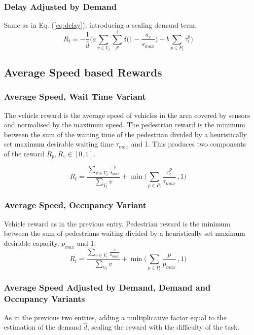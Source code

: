 \documentclass[a4paper, conference]{IEEEtran}
\begin{document}
\subsubsection{Delay Adjusted by Demand}
Same as in Eq. (\ref{eq:delay}), introducing a scaling demand term.
\begin{equation}
    R_t = -\frac{1}{\hat{d}} \bigg( a \sum_{v\in V_t}  \sum_{t^p}^t \delta \big( 1-\frac{s_v}{s_{max}} \big) + b \sum_{p \in P_t} \tau^p_{t} \bigg)
\label{eq:delay_ad}
\end{equation}

\subsection{Average Speed based Rewards}
\subsubsection{Average Speed, Wait Time Variant}
The vehicle reward is the average speed of vehicles in the area covered by sensors and normalised by the maximum speed.
The pedestrian reward is the minimum between the sum of the waiting time of the pedestrian divided by a heuristically set maximum desirable waiting time $\tau_{max}$ and 1.
This produces two components of the reward $R_p, R_v \in [0,1]$.

\begin{equation}
    R_t =  \frac{\sum_{v \in V_t} \frac{s}{s_{max}}}{\sum_{V_t} v}  +  \min \big( \sum_{p \in P_t} \frac{\tau^p_{t}}{\tau_{max}} \, , 1 \big)
\label{eq:avgspeed_wait}
\end{equation}

\subsubsection{Average Speed, Occupancy Variant}
Vehicle reward as in the previous entry.
Pedestrian reward is the minimum between the sum of pedestrians waiting divided by a heuristically set maximum desirable capacity, $p_{max}$ and 1. 
\begin{equation}
    R_t =    \frac{ \sum_{v \in V_t} \frac{s}{s_{max}}}{\sum_{V_t} v} +  \min \big( \sum_{p \in P_t} \frac{p}{p_{max}} \, , 1 \big)
\label{eq:avgspeed_occ}
\end{equation}

\subsubsection{Average Speed Adjusted by Demand, Demand and Occupancy Variants}
As in the previous two entries, adding a multiplicative factor equal to the estimation of the demand $\hat{d}$, scaling the reward with the difficulty of the task.
\end{document}
